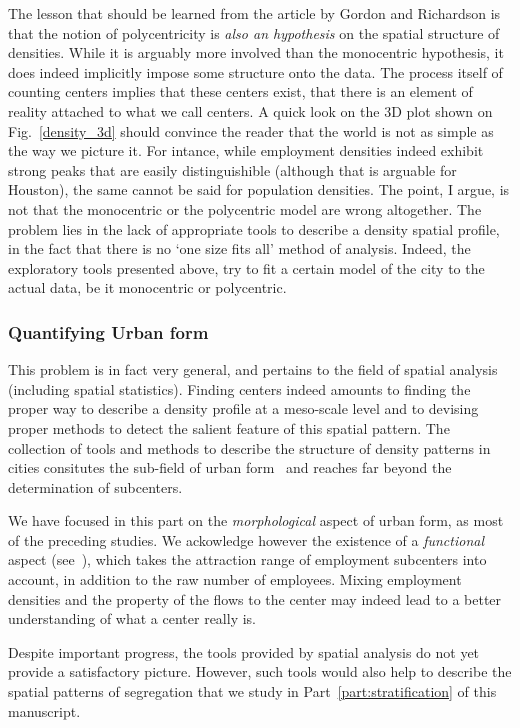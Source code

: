 The lesson that should be learned from the article by Gordon and Richardson is
that the notion of polycentricity is \emph{also an hypothesis} on the spatial
structure of densities. While it is arguably more involved than the monocentric
hypothesis, it does indeed implicitly impose some structure onto the data. The
process itself of counting centers implies that these centers exist, that there
is an element of reality attached to what we call centers. A quick look on the
3D plot shown on Fig.~\ref{density_3d} should convince the reader that the world
is not as simple as the way we picture it. For intance, while employment
densities indeed exhibit strong peaks that are easily distinguishible (although
that is arguable for Houston), the same cannot be said for population densities.
The point, I argue, is not that the monocentric or the polycentric model are
wrong altogether. The problem lies in the lack of appropriate tools to describe
a density spatial profile, in the fact that there is no `one size fits all'
method of analysis. Indeed, the exploratory tools presented above, try to fit a
certain model of the city to the actual data, be it monocentric or
polycentric.

\subsubsection{Quantifying Urban form}
\label{sub:urban_form}

This problem is in fact very general, and pertains to the field of spatial
analysis (including spatial statistics). Finding centers indeed amounts to
finding the proper way to describe a density profile at a meso-scale level and
to devising proper methods to detect the salient feature of this spatial
pattern. The collection of tools and methods to describe the structure
of density patterns in cities consitutes the sub-field of urban
form~\cite{Tsai:2005,Schwarz:2010,LeNechet:2015} and reaches far beyond the
determination of subcenters.

We have focused in this part on the \emph{morphological} aspect of urban form,
as most of the preceding studies. We ackowledge however the existence of a
\emph{functional} aspect (see~\cite{Berroir:2008}), which takes the attraction
range of employment subcenters into account, in addition to the raw number of
employees. Mixing employment densities and the property of the flows to the
center may indeed lead to a better understanding of what a center really is.

Despite important progress, the tools provided by spatial analysis do not yet
provide a satisfactory picture. However, such tools would also help to describe
the spatial patterns of segregation that we study in
Part~\ref{part:stratification} of this manuscript.

